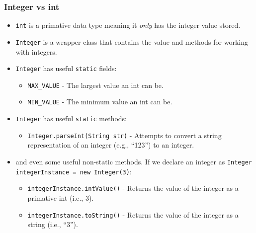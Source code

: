 \documentclass{beamer}
\begin{document}
\begin{frame}[fragile]
    \frametitle{Integer vs int}
    \begin{itemize}
        \item \lstinline|int| is a primative data type meaning it \textit{only} has the integer value stored.
            \pause
        \item \lstinline|Integer| is a wrapper class that contains the value and methods for working with integers.
            \pause
        \item \lstinline|Integer| has useful \lstinline|static| fields:
        \begin{itemize}
            \item \lstinline|MAX_VALUE| - The largest value an int can be.
            \item \lstinline|MIN_VALUE| - The minimum value an int can be.
        \end{itemize}
            \pause
        \item \lstinline|Integer| has useful \lstinline|static| methods:
        \begin{itemize}
            \item \lstinline|Integer.parseInt(String str)| - Attempts to convert a string representation of an integer (e.g., ``123'')  to an integer.
        \end{itemize}
            \pause
        \item and even some useful non-static methods. If we declare an integer as \lstinline|Integer integerInstance = new Integer(3)|:
        \begin{itemize}
            \item \lstinline|integerInstance.intValue()| - Returns the value of the integer as a primative int (i.e., 3).
            \item \lstinline|integerInstance.toString()| - Returns the value of the integer as a string (i.e., ``3'').
        \end{itemize}
    \end{itemize}
\end{frame}
\end{document}
